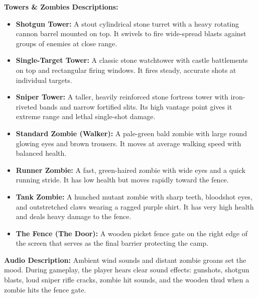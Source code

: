 \textbf{Towers \& Zombies Descriptions:}
\begin{itemize}[label=\textbullet]
  \item \textbf{Shotgun Tower:} A stout cylindrical stone turret with a heavy rotating cannon barrel mounted on top. It swivels to fire wide-spread blasts against groups of enemies at close range.
  \item \textbf{Single-Target Tower:} A classic stone watchtower with castle battlements on top and rectangular firing windows. It fires steady, accurate shots at individual targets.
  \item \textbf{Sniper Tower:} A taller, heavily reinforced stone fortress tower with iron-riveted bands and narrow fortified slits. Its high vantage point gives it extreme range and lethal single-shot damage.
  \item \textbf{Standard Zombie (Walker):} A pale-green bald zombie with large round glowing eyes and brown trousers. It moves at average walking speed with balanced health.
  \item \textbf{Runner Zombie:} A fast, green-haired zombie with wide eyes and a quick running stride. It has low health but moves rapidly toward the fence.
  \item \textbf{Tank Zombie:} A hunched mutant zombie with sharp teeth, bloodshot eyes, and outstretched claws wearing a ragged purple shirt. It has very high health and deals heavy damage to the fence.
  \item \textbf{The Fence (The Door):} A wooden picket fence gate on the right edge of the screen that serves as the final barrier protecting the camp.
\end{itemize}


\textbf{Audio Description:} Ambient wind sounds and distant zombie groans set the mood. During gameplay, the player hears clear sound effects: gunshots, shotgun blasts, loud sniper rifle cracks, zombie hit sounds, and the wooden thud when a zombie hits the fence gate.

